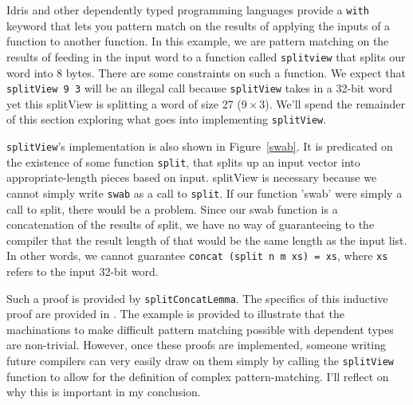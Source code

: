 Idris and other dependently typed programming languages provide a \texttt{with}
keyword that lets you pattern match on the results of applying the inputs of a
function to another function. In this example, we are pattern matching on the
results of feeding in the input word to a function called \texttt{splitview}
that splits our word into 8 bytes. There are some constraints on such a
function. We expect that \texttt{splitView 9 3} will be an illegal call because
\texttt{splitView} takes in a 32-bit word yet this splitView is splitting a word
of size 27 ($9 \times 3$). We'll spend the remainder of this section exploring
what goes into implementing \texttt{splitView}. 

\texttt{splitView}'s implementation is also shown in Figure~\ref{swab}. It is
predicated on the existence of some function \texttt{split}, that splits up an
input vector into appropriate-length pieces based on input. splitView is
necessary because we cannot simply write \texttt{swab} as a call to
\texttt{split}. If our function 'swab' were simply a call to split, there would
be a problem. Since our swab function is a concatenation of the results of
split, we have no way of guaranteeing to the compiler that the result length of
that would be the same length as the input list. In other words, we cannot
guarantee \texttt{concat (split n m xs) = xs}, where \texttt{xs} refers to the
input 32-bit word. 

Such a proof is provided by \texttt{splitConcatLemma}. The specifics of this
inductive proof are provided in \cite{power_of_pi}. The example is provided to
illustrate that the machinations to make difficult pattern matching possible
with dependent types are non-trivial. However, once these proofs are
implemented, someone writing future compilers can very easily draw on them
simply by calling the \texttt{splitView} function to allow for the definition of
complex pattern-matching. I'll reflect on why this is important in my
conclusion. 